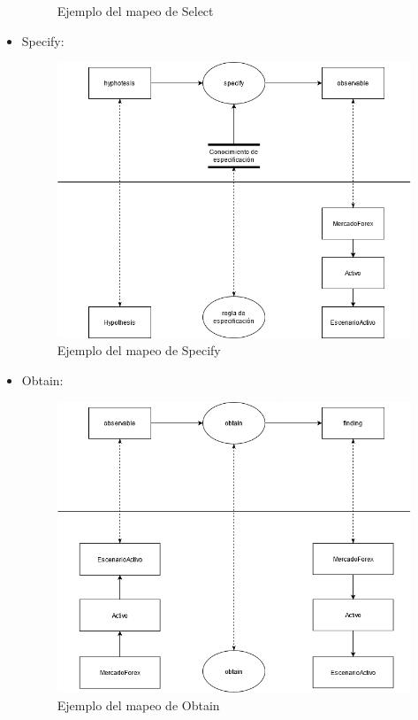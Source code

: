 \begin{itemize}
\begin{figure}[H]
    \caption{\label{fig:Select}Ejemplo del mapeo de Select}
  \end{figure}
  \item Specify: 
  \begin{figure}[H]
    \centering
    \includegraphics[scale=0.50]{imagenes/specify2.png}
    \caption{\label{fig:Specify}Ejemplo del mapeo de Specify}
  \end{figure}
  \item Obtain:  
  \begin{figure}[H]
    \centering
    \includegraphics[scale=0.50]{imagenes/obtain2.png}
    \caption{\label{fig:Obtain}Ejemplo del mapeo de Obtain}

\end{figure}
\end{itemize}
